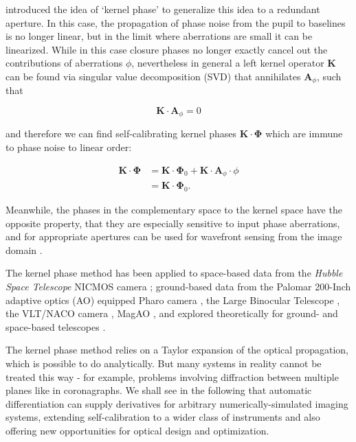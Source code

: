 \documentclass[modern]{aastex63}
\begin{document}
\citet{martinache10} introduced the idea of `kernel phase' to generalize this idea to a redundant aperture. In this case, the propagation of phase noise from the pupil to baselines is no longer linear, but in the limit where aberrations are small it can be linearized. While in this case closure phases no longer exactly cancel out the contributions of aberrations $\phi$, nevertheless in general a left kernel operator $\mathbf{K}$ can be found via singular value decomposition (SVD) that annihilates $\mathbf{A}_\phi$, such that

\begin{equation}
        \mathbf{K}\cdot\mathbf{A}_\phi = 0
\end{equation}

\noindent and therefore we can find self-calibrating kernel phases $\mathbf{K}\cdot\mathbf{\Phi}$ which are immune to phase noise to linear order:

\begin{align}
    \mathbf{K}\cdot\mathbf{\Phi} &= \mathbf{K}\cdot\mathbf{\Phi}_0 + \mathbf{K}\cdot\mathbf{A}_\phi\cdot\phi \\
    &= \mathbf{K}\cdot\mathbf{\Phi}_0.
\end{align}

Meanwhile, the phases in the complementary space to the kernel space have the opposite property, that they are especially sensitive to input phase aberrations, and for appropriate apertures can be used for wavefront sensing from the image domain \citep{martinache13,pope14}.

The kernel phase method has been applied to space-based data from the \textit{Hubble Space Telescope} NICMOS camera \citep{pope13,laugier19,martinache20}; ground-based data from the Palomar 200-Inch adaptive optics (AO) equipped Pharo camera \citep{palomar,martinache20}, the Large Binocular Telescope \citep{sallum15}, the VLT/NACO camera \citep{kammerer19}, MagAO \citep{sallum19b}, and explored theoretically for ground- and space-based telescopes \citep{ireland13,martinache11,sallum19a,ceau19}.

The kernel phase method relies on a Taylor expansion of the optical propagation, which is possible to do analytically. But many systems in reality cannot be treated this way - for example, problems involving diffraction between multiple planes like in coronagraphs. We shall see in the following that automatic differentiation can supply derivatives for arbitrary numerically-simulated imaging systems, extending self-calibration to a wider class of instruments and also offering new opportunities for optical design and optimization.
\end{document}
